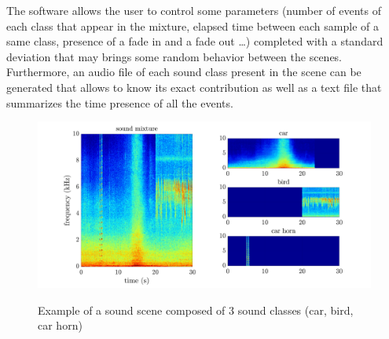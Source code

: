 \documentclass[twocolumn,a4paper,10pt]{article}
\begin{document}
The software allows the user to control some parameters (number of events of each class that appear in the mixture, elapsed time between each sample of a same class, presence of a fade in and a fade out \dots) completed with a standard deviation that may brings some random behavior between the scenes. Furthermore, an audio file of each sound class present in the scene can be generated that allows to know its exact contribution as well as a text file that summarizes the time presence of all the events.\\

\begin{figure}[h]
\centering
\includegraphics[width=\linewidth]{../image/exampleSimScene2.pdf} 
\label{fig:exampleSimScene}
\caption{Example of a sound scene composed of 3 sound classes (car, bird, car horn)}
\end{figure}
\end{document}
